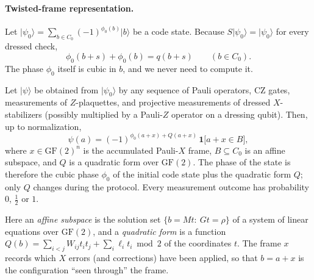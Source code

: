 \documentclass[a4paper]{article}
\newcommand{\GF}{\mathrm{GF}(2)}
\providecommand{\ket}[1]{\ensuremath{|#1\rangle}}
\begin{document}
\paragraph{Twisted-frame representation.}
Let $\ket{\psi_0}=\sum_{b\in C_0}(-1)^{\phi_0(b)}\ket{b}$ be a code state. Because $S\ket{\psi_0}=\ket{\psi_0}$ for every dressed check,
\begin{equation}
  \phi_0(b+s)+\phi_0(b)=q(b+s)\qquad(b\in C_0).
  \label{eq:stabcond}
\end{equation}
The phase $\phi_0$ itself is cubic in $b$, and we never need to compute it.

\begin{proposition}
Let $\ket{\psi}$ be obtained from $\ket{\psi_0}$ by any sequence of Pauli operators, CZ gates, measurements of $Z$-plaquettes, and projective measurements of dressed $X$-stabilizers (possibly multiplied by a Pauli-$Z$ operator on a dressing qubit). Then, up to normalization,
\begin{equation}
  \psi(a)=(-1)^{\phi_0(a+x)+Q(a+x)}\,\mathbf{1}\big[a+x\in B\big],
  \label{eq:tf}
\end{equation}
where $x\in\GF^{n}$ is the accumulated Pauli-$X$ frame, $B\subseteq C_0$ is an affine subspace, and $Q$ is a quadratic form over $\GF$. The phase of the state is therefore the cubic phase $\phi_0$ of the initial code state plus the quadratic form $Q$; only $Q$ changes during the protocol. Every measurement outcome has probability $0$, $\tfrac12$ or $1$.
\end{proposition}

Here an \emph{affine subspace} is the solution set $\{b=Mt:\ Gt=\rho\}$ of a system of linear equations over $\GF$, and a \emph{quadratic form} is a function $Q(b)=\sum_{i<j}W_{ij}t_it_j+\sum_i\ell_it_i\bmod2$ of the coordinates $t$. The frame $x$ records which $X$ errors (and corrections) have been applied, so that $b=a+x$ is the configuration ``seen through'' the frame.
\end{document}
